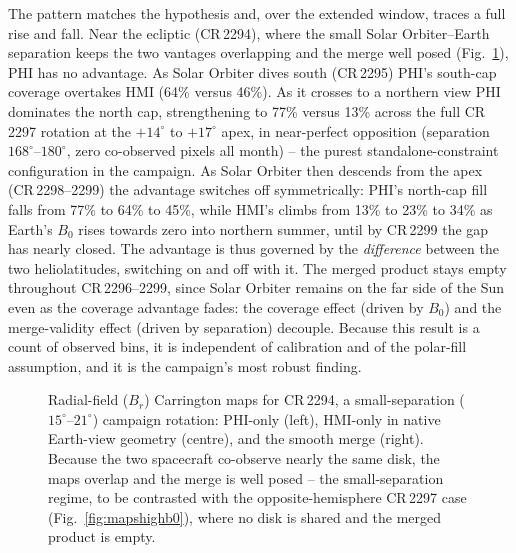 \documentclass{aa}
\begin{document}
The pattern matches the hypothesis and, over the extended window, traces a full rise and fall. Near the ecliptic (CR\,2294), where the small Solar Orbiter--Earth separation keeps the two vantages overlapping and the merge well posed (Fig.~\ref{fig:mapslowsep}), PHI has no advantage. As Solar Orbiter dives south (CR\,2295) PHI's south-cap coverage overtakes HMI (64\% versus 46\%). As it crosses to a northern view PHI dominates the north cap, strengthening to 77\% versus 13\% across the full CR\,2297 rotation at the $+14^{\circ}$ to $+17^{\circ}$ apex, in near-perfect opposition (separation $168^{\circ}$--$180^{\circ}$, zero co-observed pixels all month) -- the purest standalone-constraint configuration in the campaign. As Solar Orbiter then descends from the apex (CR\,2298--2299) the advantage switches off symmetrically: PHI's north-cap fill falls from 77\% to 64\% to 45\%, while HMI's climbs from 13\% to 23\% to 34\% as Earth's $B_0$ rises towards zero into northern summer, until by CR\,2299 the gap has nearly closed. The advantage is thus governed by the \emph{difference} between the two heliolatitudes, switching on and off with it. The merged product stays empty throughout CR\,2296--2299, since Solar Orbiter remains on the far side of the Sun even as the coverage advantage fades: the coverage effect (driven by $B_0$) and the merge-validity effect (driven by separation) decouple. Because this result is a count of observed bins, it is independent of calibration and of the polar-fill assumption, and it is the campaign's most robust finding.

\begin{figure}
\centering
\caption{Radial-field ($B_r$) Carrington maps for CR\,2294, a small-separation ($15^{\circ}$--$21^{\circ}$) campaign rotation: PHI-only (left), HMI-only in native Earth-view geometry (centre), and the smooth merge (right). Because the two spacecraft co-observe nearly the same disk, the maps overlap and the merge is well posed -- the small-separation regime, to be contrasted with the opposite-hemisphere CR\,2297 case (Fig.~\ref{fig:mapshighb0}), where no disk is shared and the merged product is empty.}
\label{fig:mapslowsep}
\end{figure}
\end{document}
